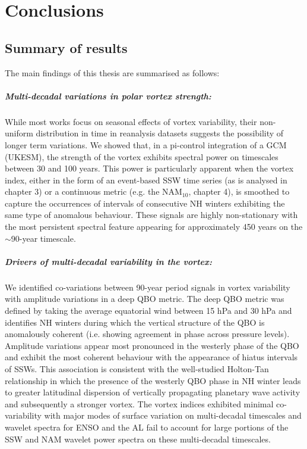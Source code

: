\chapter{Conclusions}
\label{cha:conclusions}

\section{Summary of results}

The main findings of this thesis are summarised as follows: 

\paragraph{Multi-decadal variations in polar vortex strength:}
While most works focus on seasonal effects of vortex variability, their non-uniform distribution in time in reanalysis datasets suggests the possibility of longer term variations. We showed that, in a pi-control integration of a GCM (UKESM), the strength of the vortex exhibits spectral power on timescales between 30 and 100 years. This power is particularly apparent when the vortex index, either in the form of an event-based SSW time series (as is analysed in chapter 3) or a continuous metric (e.g. the NAM$_{10}$, chapter 4), is smoothed to capture the occurrences of intervals of consecutive NH winters exhibiting the same type of anomalous behaviour. These signals are highly non-stationary with the most persistent spectral feature appearing for approximately 450 years on the $\sim$90-year timescale. 

\paragraph{Drivers of multi-decadal variability in the vortex:}
We identified co-variations between 90-year period signals in vortex variability with amplitude variations in a deep QBO metric. The deep QBO metric was defined by taking the average equatorial wind between 15 hPa and 30 hPa and identifies NH winters during which the vertical structure of the QBO is anomalously coherent (i.e. showing agreement in phase across pressure levels). Amplitude variations appear most pronounced in the westerly phase of the QBO and exhibit the most coherent behaviour with the appearance of hiatus intervals of SSWs. This association is consistent with the well-studied Holton-Tan relationship in which the presence of the westerly QBO phase in NH winter leads to greater latitudinal dispersion of vertically propagating planetary wave activity and subsequently a stronger vortex. The vortex indices exhibited minimal co-variability with major modes of surface variation on multi-decadal timescales and wavelet spectra for ENSO and the AL fail to account for large portions of the SSW and NAM wavelet power spectra on these multi-decadal timescales.

